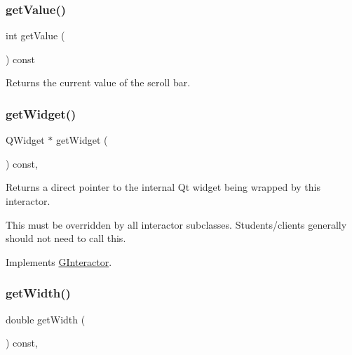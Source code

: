\mbox{\label{classGScrollBar_acdb0b383a96801f3200302b6f4a7da64}} 
\subsubsection{\texorpdfstring{get\+Value()}{getValue()}}
{\footnotesize\ttfamily int get\+Value (\begin{DoxyParamCaption}{ }\end{DoxyParamCaption}) const\hspace{0.3cm}{\ttfamily [virtual]}}



Returns the current value of the scroll bar. 

\mbox{\label{classGScrollBar_a3b33a602b31a6b809d020535a59db3b4}} 
\subsubsection{\texorpdfstring{get\+Widget()}{getWidget()}}
{\footnotesize\ttfamily Q\+Widget $\ast$ get\+Widget (\begin{DoxyParamCaption}{ }\end{DoxyParamCaption}) const\hspace{0.3cm}{\ttfamily [override]}, {\ttfamily [virtual]}}



Returns a direct pointer to the internal Qt widget being wrapped by this interactor. 

This must be overridden by all interactor subclasses. Students/clients generally should not need to call this. 

Implements \mbox{\hyperlink{classGInteractor}{G\+Interactor}}.

\mbox{\label{classGInteractor_a0ed2965abd4f5701d2cadf71239faf19}} 
\subsubsection{\texorpdfstring{get\+Width()}{getWidth()}}
{\footnotesize\ttfamily double get\+Width (\begin{DoxyParamCaption}{ }\end{DoxyParamCaption}) const\hspace{0.3cm}{\ttfamily [virtual]}, {\ttfamily [inherited]}}



